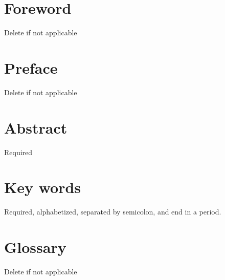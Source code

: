 \documentclass[12pt]{article}
\begin{document}
\section*{Foreword}
\normalsize Delete if not applicable\\
\section*{Preface}
\normalsize Delete if not applicable\\
\section*{Abstract}
\normalsize Required\\
\section*{Key words}
\normalsize Required, alphabetized, separated by semicolon, and end in a period.\\
\pagebreak
\begin{center}
\tableofcontents
\listoftables
\listoffigures
\end{center}
\pagebreak
\section*{Glossary}
Delete if not applicable\\
\pagebreak

\newpage

\newpage

\newpage

\newpage

\newpage

\newpage

\newpage

\newpage

\newpage

\newpage

\end{document}
